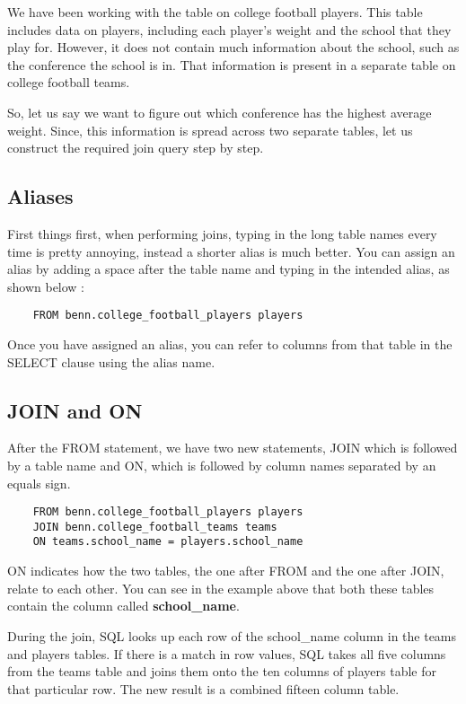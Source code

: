 \documentclass[12pt, letterpaper]{article}
\begin{document}
We have been working with the table on college football players. This table includes data on players, including each player's weight and the school that they play for. However, it does not contain much information about the school, such as the conference the school is in. That information is present in a separate table on college football teams.

So, let us say we want to figure out which conference has the highest average weight. Since, this information is spread across two separate tables, let us construct the required join query step by step.

\subsection{Aliases}
 First things first, when performing joins, typing in the long table names every time is pretty annoying, instead a shorter alias is much better. You can assign an alias by adding a space after the table name and typing in the intended alias, as shown below : 
 
\begin{verbatim}
    FROM benn.college_football_players players
\end{verbatim}

Once you have assigned an alias, you can refer to columns from that table in the SELECT clause using the alias name.

\subsection{JOIN and ON}
After the FROM statement, we have two new statements, JOIN which is followed by a table name and ON, which is followed by column names separated by an equals sign.

\begin{verbatim}
    FROM benn.college_football_players players
    JOIN benn.college_football_teams teams
    ON teams.school_name = players.school_name
\end{verbatim}

ON indicates how the two tables, the one after FROM and the one after JOIN, relate to each other. You can see in the example above that both these tables contain the column called \textbf{school\_name}.

During the join, SQL looks up each row of the school\_name column in the teams and players tables. If there is a match in row values, SQL takes all five columns from the teams table and joins them onto the ten columns of players table for that particular row. The new result is a combined fifteen column table.
\end{document}
